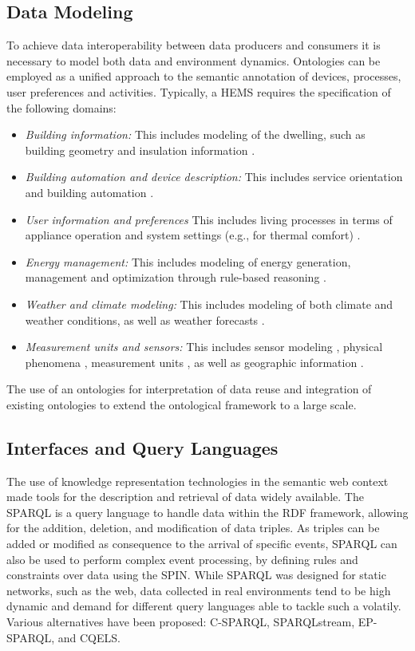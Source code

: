 \documentclass{article}
\begin{document}
\subsection{Data Modeling}\label{subsect:ontologies}To achieve data interoperability between data producers and consumers it is necessary to model both data and environment dynamics.
Ontologies can be employed as a unified approach to the semantic annotation of devices, processes, user preferences and activities.
Typically, a \ac{HEMS} requires the specification of the following domains:

\begin{itemize}
  \item \textit{Building information:}
  This includes modeling of the dwelling, such as building geometry and insulation information \cite{CESBP2013_Kofler}.
  \item \textit{Building automation and device description:}
  This includes service orientation \cite{Stavropoulos:2012,Preuveneers04towardsan} and building automation \cite{dogont}.
  \item \textit{User information and preferences}
  This includes living processes in terms of appliance operation and system settings (e.g., for thermal comfort) \cite{EG_ICE2013_Kofler}.
  \item \textit{Energy management:}
  This includes modeling of energy generation, management \cite{Reinisch:2011} and optimization through rule-based reasoning \cite{Tomic:2010}.
  \item \textit{Weather and climate modeling:} This includes modeling of both climate and weather conditions, as well as weather forecasts \cite{IASTED2012_Kofler}.
  \item \textit{Measurement units and sensors:}
  This includes sensor modeling \cite{websem312}, physical phenomena \cite{sweet}, measurement units \cite{QUDT}, as well as geographic information \cite{WGS84}.
\end{itemize}
The use of an ontologies for interpretation of data reuse and integration of existing ontologies to extend the ontological framework to a large scale.

\subsection{Interfaces and Query Languages}
The use of knowledge representation technologies in the semantic web context made tools for the description and retrieval of data widely available.
The \ac{SPARQL} is a query language to handle data within the \ac{RDF} framework, allowing for the addition, deletion, and modification of data triples.
As triples can be added or modified as consequence to the arrival of specific events,
\ac{SPARQL} can also be used to perform complex event processing, by defining rules and constraints over data using the \ac{SPIN}.
While \ac{SPARQL} was designed for static networks, such as the web, data collected in real environments tend to be high dynamic and demand for different query languages able to tackle such a volatily.
Various alternatives have been proposed: C-SPARQL, SPARQLstream, EP-SPARQL, and CQELS.
\end{document}
